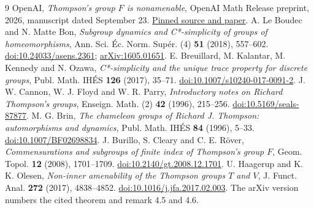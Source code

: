 \documentclass[11pt]{article}
\begin{document}
\begin{thebibliography}{9}
 OpenAI, \emph{Thompson's group $F$ is nonamenable}, OpenAI Math Release preprint, 2026, manuscript dated September 23. \href{https://github.com/openai/math/blob/adc7f1241b42e322a6451854ab7e4b4c146bf78a/preprints/Thompsons-group-F-is-nonamenable-September-23-2026/paper.pdf}{Pinned source and paper}.
 A. Le Boudec and N. Matte Bon, \emph{Subgroup dynamics and C*-simplicity of groups of homeomorphisms}, Ann. Sci. \'Ec. Norm. Sup\'er. (4) \textbf{51} (2018), 557--602. \href{https://doi.org/10.24033/asens.2361}{doi:10.24033/asens.2361}; \href{https://arxiv.org/abs/1605.01651}{arXiv:1605.01651}.
 E. Breuillard, M. Kalantar, M. Kennedy and N. Ozawa, \emph{C*-simplicity and the unique trace property for discrete groups}, Publ. Math. IH\'ES \textbf{126} (2017), 35--71. \href{https://doi.org/10.1007/s10240-017-0091-2}{doi:10.1007/s10240-017-0091-2}.
 J. W. Cannon, W. J. Floyd and W. R. Parry, \emph{Introductory notes on Richard Thompson's groups}, Enseign. Math. (2) \textbf{42} (1996), 215--256. \href{https://doi.org/10.5169/seals-87877}{doi:10.5169/seals-87877}.
 M. G. Brin, \emph{The chameleon groups of Richard J. Thompson: automorphisms and dynamics}, Publ. Math. IH\'ES \textbf{84} (1996), 5--33. \href{https://doi.org/10.1007/BF02698834}{doi:10.1007/BF02698834}.
 J. Burillo, S. Cleary and C. E. R\"over, \emph{Commensurations and subgroups of finite index of Thompson's group $F$}, Geom. Topol. \textbf{12} (2008), 1701--1709. \href{https://doi.org/10.2140/gt.2008.12.1701}{doi:10.2140/gt.2008.12.1701}.
 U. Haagerup and K. K. Olesen, \emph{Non-inner amenability of the Thompson groups $T$ and $V$}, J. Funct. Anal. \textbf{272} (2017), 4838--4852. \href{https://doi.org/10.1016/j.jfa.2017.02.003}{doi:10.1016/j.jfa.2017.02.003}. The arXiv version numbers the cited theorem and remark 4.5 and 4.6.
\end{thebibliography}
\end{document}
